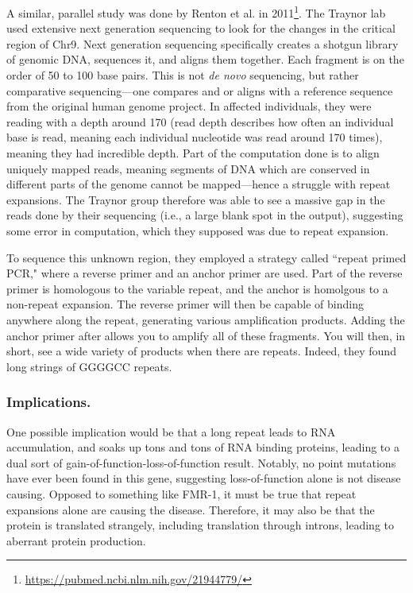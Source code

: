 A similar, parallel study was done by Renton et al. in 2011\footnote{\url{https://pubmed.ncbi.nlm.nih.gov/21944779/}}. The Traynor lab used extensive next generation sequencing to look for the changes in the critical region of Chr9. Next generation sequencing specifically creates a shotgun library of genomic DNA, sequences it, and aligns them together. Each fragment is on the order of 50 to 100 base pairs. This is not \textit{de novo} sequencing, but rather comparative sequencing---one compares and or aligns with a reference sequence from the original human genome project. In affected individuals, they were reading with a depth around 170 (read depth describes how often an individual base is read, meaning each individual nucleotide was read around 170 times), meaning they had incredible depth. Part of the computation done is to align uniquely mapped reads, meaning segments of DNA which are conserved in different parts of the genome cannot be mapped---hence a struggle with repeat expansions. The Traynor group therefore was able to see a massive gap in the reads done by their sequencing (i.e., a large blank spot in the output), suggesting some error in computation, which they supposed was due to repeat expansion.\newline

To sequence this unknown region, they employed a strategy called ``repeat primed PCR," where a reverse primer and an anchor primer are used. Part of the reverse primer is homologous to the variable repeat, and the anchor is homolgous to a non-repeat expansion. The reverse primer will then be capable of binding anywhere along the repeat, generating various amplification products. Adding the anchor primer after allows you to amplify all of these fragments. You will then, in short, see a wide variety of products when there are repeats. Indeed, they found long strings of GGGGCC repeats. 

\subsubsection*{Implications.}

One possible implication would be that a long repeat leads to RNA accumulation, and soaks up tons and tons of RNA binding proteins, leading to a dual sort of gain-of-function-loss-of-function result. Notably, no point mutations have ever been found in this gene, suggesting loss-of-function alone is not disease causing. Opposed to something like FMR-1, it must be true that repeat expansions alone are causing the disease. Therefore, it may also be that the protein is translated strangely, including translation through introns, leading to aberrant protein production.\newline

